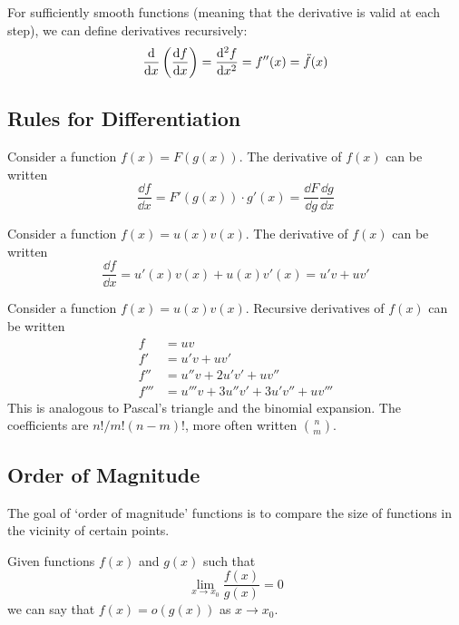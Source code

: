 \documentclass{article}
\begin{document}
For sufficiently smooth functions (meaning that the derivative is valid at each step), we can define derivatives recursively:
\[
	\frac{\mathrm{d}}{\dd x}\left( \frac{\dd f}{\dd x} \right)
	= \frac{\mathrm{d}^2f}{\dd x^2}
	= f''(x) = \ddot f (x)
\]

\subsection{Rules for Differentiation}
\begin{definition}
	Consider a function $f(x) = F(g(x))$. The derivative of $f(x)$ can be written
	\begin{equation}
		\frac{\dd f}{\dd x} = F'(g(x)) \cdot g'(x) = \frac{\dd F}{\dd g} \frac{\dd g}{\dd x}
	\end{equation}
\end{definition}

\begin{definition}
	Consider a function $f(x) = u(x)v(x)$. The derivative of $f(x)$ can be written
	\begin{equation}
		\frac{\dd f}{\dd x} = u'(x)v(x) + u(x)v'(x) = u'v + uv'
	\end{equation}
\end{definition}

\begin{definition}
	Consider a function $f(x) = u(x)v(x)$. Recursive derivatives of $f(x)$ can be written
	\begin{align}
		f    & = uv                                        \\
		f'   & = u'v + uv' \nonumber                       \\
		f''  & = u''v + 2u'v' + uv'' \nonumber             \\
		f''' & = u'''v + 3u''v' + 3u'v'' + uv''' \nonumber
	\end{align}
	This is analogous to Pascal's triangle and the binomial expansion. The coefficients are $n!/m!(n-m)!$, more often written $n \choose m$.
\end{definition}

\subsection{Order of Magnitude}
The goal of `order of magnitude' functions is to compare the size of functions in the vicinity of certain points.
\begin{definition}[Little $o$]
	Given functions $f(x)$ and $g(x)$ such that
	\begin{equation}
		\lim\limits_{x \to x_0} \frac{f(x)}{g(x)} = 0
	\end{equation}
	we can say that $f(x) = o(g(x))$ as $x \to x_0$.
\end{definition}
\end{document}
